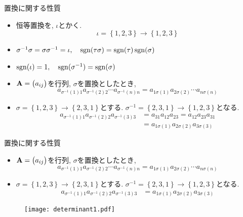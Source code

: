 \documentclass[dvipdfmx,notheorems,t]{beamer}
\begin{document}
\begin{frame}{置換に関する性質}
\begin{itemize}
  \item 恒等置換を, $\iota$とかく.
  $$\iota = \left\{ 1, 2, 3 \right\} \to \left\{ 1, 2, 3 \right\}$$
  \item $\sigma^{-1} \sigma = \sigma \sigma^{-1} = \iota, \quad \operatorname{sgn}(\tau \sigma) = \operatorname{sgn}(\tau) \operatorname{sgn}(\sigma)$
  \item $\operatorname{sgn}(\iota) = 1, \quad \operatorname{sgn}(\sigma^{-1}) = \operatorname{sgn}(\sigma)$
  \item $\vb{A} = \mqty(a_{ij})$を行列, $\sigma$を置換としたとき,
  $$a_{\sigma^{-1}(1) 1} a_{\sigma^{-1}(2) 2} \cdots a_{\sigma^{-1}(n) n}
    = a_{1 \sigma(1)} a_{2 \sigma(2)} \cdots a_{n \sigma(n)}$$
  \item $\sigma = \left\{ 1, 2, 3 \right\} \to \left\{ 2, 3, 1 \right\}$とする.
  $\sigma^{-1} = \left\{ 2, 3, 1 \right\} \to \left\{ 1, 2, 3 \right\}$となる.
  \begin{align*}
    a_{\sigma^{-1}(1) 1} a_{\sigma^{-1}(2) 2} a_{\sigma^{-1}(3) 3}
      &= a_{31} a_{12} a_{23} = a_{12} a_{23} a_{31} \\
      &= a_{1 \sigma(1)} a_{2 \sigma(2)} a_{3 \sigma(3)}
  \end{align*}
\end{itemize}
\end{frame}

\begin{frame}{置換に関する性質}
\begin{itemize}
  \item $\vb{A} = \mqty(a_{ij})$を行列, $\sigma$を置換としたとき,
  $$a_{\sigma^{-1}(1) 1} a_{\sigma^{-1}(2) 2} \cdots a_{\sigma^{-1}(n) n}
    = a_{1 \sigma(1)} a_{2 \sigma(2)} \cdots a_{n \sigma(n)}$$
  \item $\sigma = \left\{ 1, 2, 3 \right\} \to \left\{ 2, 3, 1 \right\}$とする.
  $\sigma^{-1} = \left\{ 2, 3, 1 \right\} \to \left\{ 1, 2, 3 \right\}$となる.
  \begin{align*}
    a_{\sigma^{-1}(1) 1} a_{\sigma^{-1}(2) 2} a_{\sigma^{-1}(3) 3}
      &= a_{1 \sigma(1)} a_{2 \sigma(2)} a_{3 \sigma(3)}
  \end{align*}
\end{itemize}

\begin{figure}
  \centering
  \texttt{[image: determinant1.pdf]}
\end{figure}
\end{frame}
\end{document}

